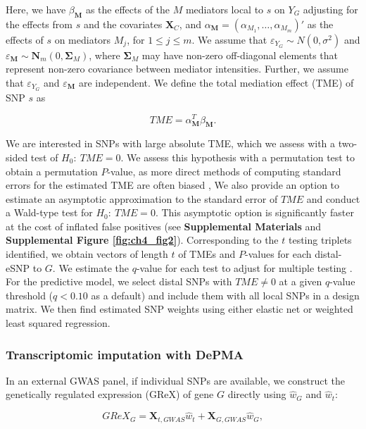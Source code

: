 Here, we have $\beta_{\mathbf{M}}$ as the
effects of the $M$ mediators local to $s$ on $Y_G$ adjusting
for the effects from $s$ and the covariates $\mathbf{X}_C$, and 
$\alpha_{\mathbf{M}} = (\alpha_{M_1},\ldots,\alpha_{M_m})'$
as the effects of $s$ on mediators $M_j$, for $1 \leq j \leq m$.
We assume that $\varepsilon_{Y_G} \sim N(0,\sigma^2)$ and 
$\varepsilon_{\mathbf{M}} \sim \mathbf{N}_m\left(0,\mathbf{\Sigma}_M\right)$,
where $\mathbf{\Sigma}_M$ may have non-zero off-diagonal
elements that
represent non-zero covariance between mediator
intensities. 
Further, we assume that $\varepsilon_{Y_G}$ and
$\varepsilon_{\mathbf{M}}$ are independent.
We define the total mediation effect
(TME) 
\cite{Sobel1982AsymptoticModels} of SNP $s$
as 

$$TME = \alpha_{\mathbf{M}}^T\beta_{\mathbf{M}}.$$

\noindent We are interested in SNPs with large absolute TME, which
we assess with a two-sided test of $H_0:~TME = 0$.
We assess this hypothesis with a permutation test to obtain a
permutation $P$-value,
as more direct methods of computing standard errors
for the estimated TME are often biased \cite{Mackinnon2004,Shan2019},
We also provide an option to estimate
an asymptotic approximation to the
standard error of $TME$ 
and conduct a Wald-type test for
$H_0:~TME = 0$. This asymptotic option 
is significantly faster at
the cost of inflated false positives 
(see \textbf{Supplemental Materials}
and 
\textbf{Supplemental Figure \ref{fig:ch4_fig2}}).
Corresponding to the $t$ testing triplets identified, 
we obtain vectors of length $t$ of TMEs and $P$-values
for each distal-eSNP to $G$. We estimate
the $q$-value for each test to adjust
for multiple testing \cite{Storey2019b}.
For the predictive model, we select distal
SNPs with $TME \neq 0$ 
at a given $q$-value threshold ($q < 0.10$
as a default)
and include them with all local SNPs in
a design matrix. We then find estimated SNP
weights using either elastic net or weighted least
squared regression.

\subsubsection{Transcriptomic imputation with DePMA}
In an external GWAS panel, if individual SNPs are 
available, we construct the genetically regulated
expression (GReX) of gene $G$
directly using $\hat{w}_G$ and $\hat{w}_t$:

$$GReX_G = \mathbf{X}_{t,GWAS}\hat{w}_{t} + 
\mathbf{X}_{G,GWAS}\hat{w}_G,$$

